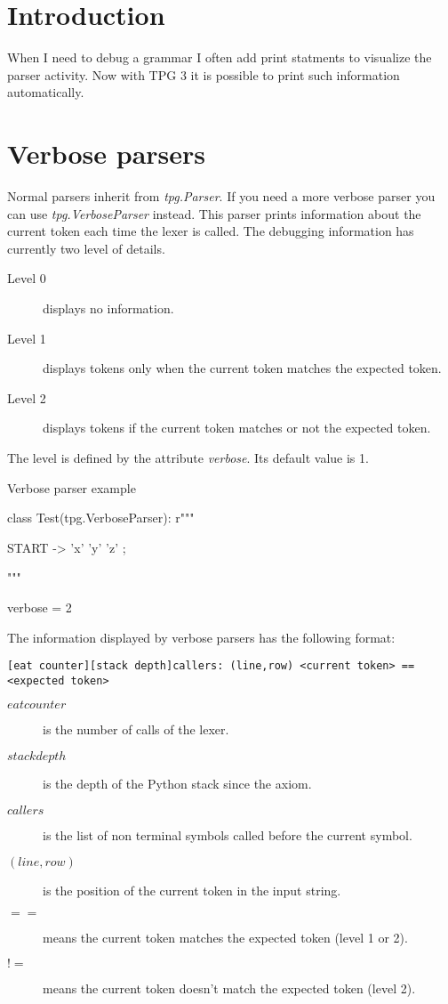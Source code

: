 \section{Introduction}          \label{debug}

When I need to debug a grammar I often add print statments to visualize the parser activity.
Now with TPG 3 it is possible to print such information automatically.

\section{Verbose parsers}

Normal parsers inherit from \emph{tpg.Parser}.
If you need a more verbose parser you can use \emph{tpg.VerboseParser} instead.
This parser prints information about the current token each time the lexer is called.
The debugging information has currently two level of details.

\begin{description}
    \item [Level 0] displays no information.
    \item [Level 1] displays tokens only when the current token matches the expected token.
    \item [Level 2] displays tokens if the current token matches or not the expected token.
\end{description}

The level is defined by the attribute \emph{verbose}. Its default value is 1.

\begin{code}
\caption{Verbose parser example}                            \label{debug:example}
\begin{verbatimtab}[4]
class Test(tpg.VerboseParser):
    r"""

    START -> 'x' 'y' 'z' ;

    """

    verbose = 2
\end{verbatimtab}
\end{code}

The information displayed by verbose parsers has the following format:
\begin{verbatim}
[eat counter][stack depth]callers: (line,row) <current token> == <expected token>
\end{verbatim}

\begin{description}
    \item [$eat counter$] is the number of calls of the lexer.
    \item [$stack depth$] is the depth of the Python stack since the axiom.
    \item [$callers$] is the list of non terminal symbols called before the current symbol.
    \item [$(line,row)$] is the position of the current token in the input string.
    \item [$==$] means the current token matches the expected token (level 1 or 2).
    \item [$!=$] means the current token doesn't match the expected token (level 2).
\end{description}
